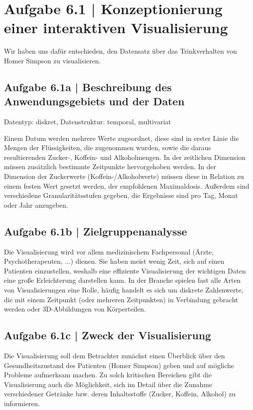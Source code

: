 \documentclass[a4paper,12pt,ngerman]{scrartcl}
\begin{document}
\pagestyle{fancy} %

\section{Aufgabe 6.1 | Konzeptionierung einer interaktiven Visualisierung}
Wir haben uns dafür entschieden, den Datensatz über das Trinkverhalten von Homer Simpson zu visualisieren.

\subsection{Aufgabe 6.1a | Beschreibung des Anwendungsgebiets und der Daten}
Datentyp: diskret, Datenstruktur: temporal, multivariat

Einem Datum werden mehrere Werte zugeordnet, diese sind in erster Linie die Mengen der Flüssigkeiten, die zugenommen wurden, sowie die daraus resultierenden Zucker-, Koffein- und Alkoholmengen. In der zeitlichen Dimension müssen zusätzlich bestimmte Zeitpunkte hervorgehoben werden. In der Dimension der Zuckerwerte (Koffein-/Alkoholwerte) müssen diese in Relation zu einem festen Wert gesetzt werden, der empfohlenen Maximaldosis. Außerdem sind verschiedene Granularitätsstufen gegeben, die Ergebnisse sind pro Tag, Monat oder Jahr anzugeben.

\subsection{Aufgabe 6.1b | Zielgruppenanalysse}
Die Visualisierung wird vor allem medizinischem Fachpersonal (Ärzte, Psychotherapeuten, ...) dienen. Sie haben meist wenig Zeit, sich auf einen Patienten einzustellen, weshalb eine effiziente Visualisierung der wichtigen Daten eine große Erleichterung darstellen kann. In der Branche spielen fast alle Arten von Visualisierungen eine Rolle, häufig handelt es sich um diskrete Zahlenwerte, die mit einem Zeitpunkt (oder mehreren Zeitpunkten) in Verbindung gebracht werden oder 3D-Abbildungen von Körperteilen.

\subsection{Aufgabe 6.1c | Zweck der Visualisierung}
Die Visualisierung soll dem Betrachter zunächst einen Überblick über den Gesundheitszustand des Patienten (Homer Simpson) geben und auf mögliche Probleme aufmerksam machen. Zu solch kritischen Bereichen gibt die Visualisierung auch die Möglichkeit, sich im Detail über die Zunahme verschiedener Getränke bzw. deren Inhaltsstoffe (Zucker, Koffein, Alkohol) zu informieren.
\end{document}
